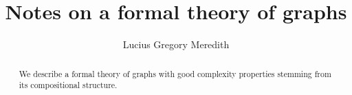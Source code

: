 \def\lastname{Meredith}

\title{Notes on a formal theory of graphs}

\author{ Lucius Gregory Meredith
}
 

\maketitle              %


\begin{abstract}

  We describe a formal theory of graphs with good complexity properties stemming from its compositional structure.

\end{abstract}



